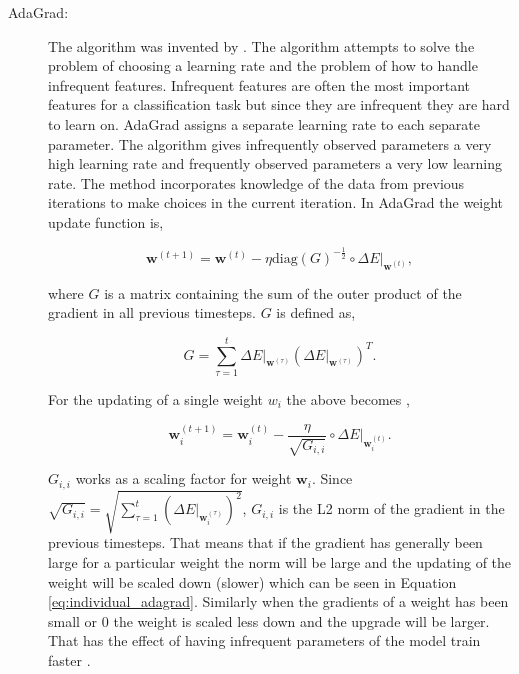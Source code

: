\begin{description}

    \item[\gls{AdaGrad}:]

        The algorithm was invented by \cite{Duchi:2011:ASM:1953048.2021068}.
        The algorithm attempts to solve the problem of choosing a learning
        rate and the problem of how to handle infrequent features. Infrequent
        features are often the most important features for a classification task
        but since they are infrequent they are hard to learn on. \gls{AdaGrad}
        assigns a separate learning rate to each separate parameter. The
        algorithm gives infrequently observed parameters a very high learning
        rate and frequently observed parameters a very low learning rate. The
        method incorporates knowledge of the data from previous iterations to
        make choices in the current iteration. In \gls{AdaGrad} the weight
        update function is,

        \begin{equation}
            \mathbf{w}^{(t+1)} =
                \mathbf{w}^{(t)} -
                \eta \text{diag}(G)^{-\frac{1}{2}} \circ
                \Delta E|_{\mathbf{w}^{(t)}},
        \end{equation}

        where $G$ is a matrix containing the sum of the outer product of the
        gradient in all previous timesteps. $G$ is defined as,

        \begin{equation}
            G = \sum_{\tau=1}^t \Delta E|_{\mathbf{w}^{(\tau)}}
                \left(
                    \Delta E|_{\mathbf{w}^{(\tau)}}
                \right)^T.
        \end{equation}

        For the updating of a single weight $w_i$ the above becomes
        \cite{Duchi:2011:ASM:1953048.2021068},

        \begin{equation}
            \label{eq:individual_adagrad}
            \mathbf{w}_i^{(t+1)} =
                \mathbf{w}_i^{(t)} - \frac{\eta}{\sqrt{G_{i,i}}} \circ
                \Delta E|_{\mathbf{w}_i^{(t)}}.
        \end{equation}

        $G_{i,i}$ works as a scaling factor for weight $\mathbf{w}_i$.
        Since $\sqrt{G_{i,i}} = \sqrt{\sum_{\tau=1}^t \left(\Delta
        E|_{\mathbf{w}^{(\tau)}_i}\right)^2}$, $G_{i,i}$ is the L2 norm
        of the gradient in the previous timesteps. That means that if the
        gradient has generally been large for a particular weight the norm
        will be large and the updating of the weight will be scaled down
        (slower) which can be seen in Equation \eqref{eq:individual_adagrad}.
        Similarly when the gradients of a weight has been small or 0 the
        weight is scaled less down and the upgrade will be larger. That has
        the effect of having infrequent parameters of the model train faster
        \cite{Duchi:2011:ASM:1953048.2021068}.


\end{description}
